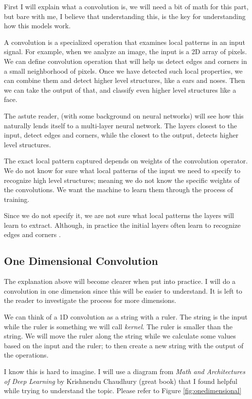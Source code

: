 \documentclass[10pt, twocolumn]{article}
\begin{document}
First I will explain what a convolution is, we will need a bit of math for this
part, but bare with me, I believe that understanding this, is the key for
understanding how this models work.

A convolution is a specialized operation that examines local patterns in an
input signal. \cite{mathdl} For example, when we analyze an image, the input is
a 2D array of pixels. We can define convolution operation that will help us
detect edges and corners in a small neighborhood of pixels. Once we have
detected such local properties, we can combine them and detect higher level
structures, like a ears and noses. Then we can take the output of that, and
classify even higher level structures like a face.

The astute reader, (with some background on neural networks) will see how this
naturally lends itself to a multi-layer neural network. The layers closest to
the input, detect edges and corners, while the closest to the output, detects
higher level structures.

The exact local pattern captured depends on weights of the convolution
operator. We do not know for sure what local patterns of the input we need to
specify to recognize high level structures; meaning we do not know the specific
weights of the convolutions. We want the machine to learn them through the
process of training.

Since we do not specify it, we are not sure what local patterns the layers will
learn to extract. Although, in practice the initial layers often learn to
recognize edges and corners \cite{mathdl}.

\subsection{One Dimensional Convolution}

The explanation above will become clearer when put into practice. I will do a
convolution in one dimension since this will be easier to understand. It is
left to the reader to investigate the process for more dimensions.

We can think of a 1D convolution as a string with a ruler. The string is the
input while the ruler is something we will call \emph{kernel}. The ruler is
smaller than the string. We will move the ruler along the string while we
calculate some values based on the input and the ruler; to then create a new
string with the output of the operations.

I know this is hard to imagine. I will use a diagram from \emph{Math and
Architectures of Deep Learning} by Krishnendu Chaudhury (great book) that I
found helpful while trying to understand the topic. Please refer to Figure
\ref{fig:onedimensional}
\end{document}
